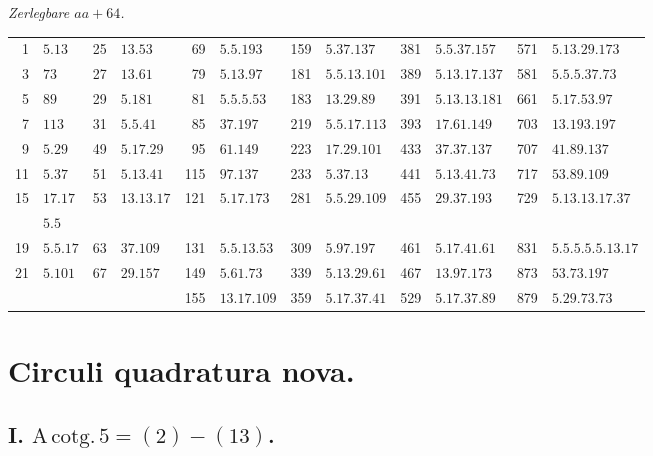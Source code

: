 \documentclass[10pt,a4paper]{article}
\begin{document}
\begin{center}
\textit{Zerlegbare $aa+64$.}
\smallskip

\begin{tabular}{r l | r l | r l | r l | r l}
1 & $5.13$ & 25 & $13.53$ & 69 & $5.5.193$ & 159 & $5.37.137$ & 381 & $5.5.37.157$ & 571 & $5.13.29.173$ \\
3 & $73$ & 27 & $13.61$ & 79 & $5.13.97$ & 181 & $5.5.13.101$ & 389 & $5.13.17.137$ & 581 & $5.5.5.37.73$ \\
5 & $89$ & 29 & $5.181$ & 81 & $5.5.5.53$ & 183 & $13.29.89$ & 391 & $5.13.13.181$ & 661 & $5.17.53.97$ \\
7 & $113$ & 31 & $5.5.41$ & 85 & $37.197$ & 219 & $5.5.17.113$ & 393 & $17.61.149$ & 703 & $13.193.197$ \\
9 & $5.29$ & 49 & $5.17.29$ & 95 & $61.149$ & 223 & $17.29.101$ & 433 & $37.37.137$ & 707 & $41.89.137$ \\
11 & $5.37$ & 51 & $5.13.41$ & 115 & $97.137$ & 233 & $5.37.13$ & 441 & $5.13.41.73$ & 717 & $53.89.109$ \\
15 & $17.17$ & 53 & $13.13.17$ & 121 & $5.17.173$ & 281 & $5.5.29.109$ & 455 & $29.37.193$ & 729 & $5.13.13.17.37$ \\
   & $5.5$ & & & & & & & & & & \\
19 & $5.5.17$ & 63 & $37.109$ & 131 & $5.5.13.53$ & 309 & $5.97.197$ & 461 & $5.17.41.61$ & 831 & $5.5.5.5.5.13.17$ \\
21 & $5.101$ & 67 & $29.157$ & 149 & $5.61.73$ & 339 & $5.13.29.61$ & 467 & $13.97.173$ & 873 & $53.73.197$ \\
   & & & & 155 & $13.17.109$ & 359 & $5.17.37.41$ & 529 & $5.17.37.89$ & 879 & $5.29.73.73$ \\
\end{tabular}
\end{center}

\newpage

\section{Circuli quadratura nova.}

\subsection*{I. $\mathrm{A\,cotg.}\,5 = (2) - (13)$.}
\end{document}
